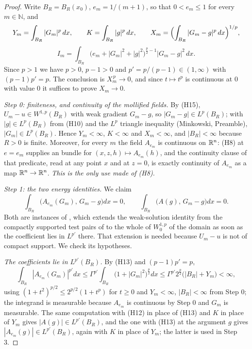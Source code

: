 \begin{proof}
Write $B_R=B_R(x_0)$, $e_m=1/(m+1)$, so that $0<e_m\le1$ for every
$m\in\mathbb{N}$, and
\[
Y_m=\int_{B_R}|G_m|^p\,dx,
\qquad
K=\int_{B_R}|g|^p\,dx,
\qquad
X_m=\Bigl(\int_{B_R}|G_m-g|^p\,dx\Bigr)^{1/p},
\]
\[
I_m=\int_{B_R}\bigl(e_m+|G_m|^2+|g|^2\bigr)^{\frac p2-1}|G_m-g|^2\,dx .
\]
Since $p>1$ we have $p>0$, $p-1>0$ and $p'=p/(p-1)\in(1,\infty)$ with
$(p-1)p'=p$.  The conclusion is $X_m^{\,p}\to0$, and since $t\mapsto t^p$ is
continuous at $0$ with value $0$ it suffices to prove $X_m\to0$.

\emph{Step 0: finiteness, and continuity of the mollified fields.}  By (H15),
$U_m-u\in W^{1,p}(B_R)$ with weak gradient $G_m-g$, so $|G_m-g|\in L^p(B_R)$;
with $|g|\in L^p(B_R)$ from (H10) and the $L^p$ triangle inequality (Minkowski,
Preamble), $|G_m|\in L^p(B_R)$.  Hence $Y_m<\infty$, $K<\infty$ and
$X_m<\infty$, and $|B_R|<\infty$ because $R>0$ is finite.  Moreover, for every
$m$ the field $A_{e_m}$ is continuous on $\mathbb{R}^n$: (H8) at $e=e_m$ supplies an
 bundle for $(x,z,h)\mapsto A_{e_m}(h)$, and the
continuity clause of that predicate, read at any point $x$ and at $z=0$, is
exactly continuity of $A_{e_m}$ as a map $\mathbb{R}^n\to\mathbb{R}^n$.  \emph{This is the only
use made of (H8).}

\emph{Step 1: the two energy identities.}  We claim
\[
\int_{B_R}\bigl(A_{e_m}(G_m),\,G_m-g\bigr)dx=0,
\qquad
\int_{B_R}\bigl(A(g),\,G_m-g\bigr)dx=0 .
\tag{E}
\]
Both are instances of , which extends the
weak-solution identity from the compactly supported test pairs of
 to the whole of $W^{1,p}_0$ of the domain as soon as
the coefficient lies in $L^{p'}$ there.  That extension is needed because
$U_m-u$ is not of compact support.  We check its hypotheses.

\emph{The coefficients lie in $L^{p'}(B_R)$.}  By (H13) and $(p-1)p'=p$,
\[
\int_{B_R}|A_{e_m}(G_m)|^{p'}dx
\le\Gamma^{p'}\int_{B_R}\bigl(1+|G_m|^2\bigr)^{\frac p2}dx
\le\Gamma^{p'}2^{\frac p2}\bigl(|B_R|+Y_m\bigr)<\infty ,
\tag{1a}
\]
using $(1+t^2)^{p/2}\le2^{p/2}(1+t^p)$ for $t\ge0$ and $Y_m<\infty$,
$|B_R|<\infty$ from Step 0; the integrand is measurable because $A_{e_m}$ is
continuous by Step 0 and $G_m$ is measurable.  The same computation with (H12)
in place of (H13) and $K$ in place of $Y_m$ gives
$|A(g)|\in L^{p'}(B_R)$, and the one with (H13) at the argument $g$ gives
$|A_{e_m}(g)|\in L^{p'}(B_R)$, again with $K$ in place of $Y_m$; the latter is
used in Step 3.


\end{proof}
